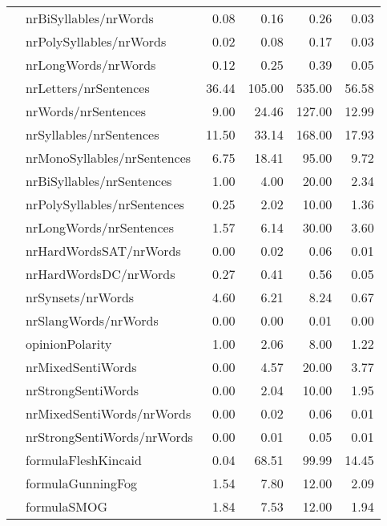 \begin{tabular}{|l|l|r|r|r|r|}
 & nrBiSyllables/nrWords & 0.08 & 0.16 & 0.26 & 0.03 \\ \cline{2-6}
 & nrPolySyllables/nrWords & 0.02 & 0.08 & 0.17 & 0.03 \\ \cline{2-6}
 & nrLongWords/nrWords & 0.12 & 0.25 & 0.39 & 0.05 \\ \hline
\parbox[t]{2mm}{} & nrLetters/nrSentences & 36.44 & 105.00 & 535.00 & 56.58 \\ 
 & nrWords/nrSentences & 9.00 & 24.46 & 127.00 & 12.99 \\ 
 & nrSyllables/nrSentences & 11.50 & 33.14 & 168.00 & 17.93 \\ 
 & nrMonoSyllables/nrSentences & 6.75 & 18.41 & 95.00 & 9.72 \\ 
 & nrBiSyllables/nrSentences & 1.00 & 4.00 & 20.00 & 2.34 \\ 
 & nrPolySyllables/nrSentences & 0.25 & 2.02 & 10.00 & 1.36 \\ 
 & nrLongWords/nrSentences & 1.57 & 6.14 & 30.00 & 3.60 \\ \hline
\parbox[t]{2mm}{} & nrHardWordsSAT/nrWords & 0.00 & 0.02 & 0.06 & 0.01 \\ 
 & nrHardWordsDC/nrWords & 0.27 & 0.41 & 0.56 & 0.05 \\ 
 & nrSynsets/nrWords & 4.60 & 6.21 & 8.24 & 0.67 \\ 
 & nrSlangWords/nrWords & 0.00 & 0.00 & 0.01 & 0.00 \\ \hline
\parbox[t]{2mm}{} & opinionPolarity & 1.00 & 2.06 & 8.00 & 1.22 \\ 
 & nrMixedSentiWords & 0.00 & 4.57 & 20.00 & 3.77 \\ 
 & nrStrongSentiWords & 0.00 & 2.04 & 10.00 & 1.95 \\ 
 & nrMixedSentiWords/nrWords & 0.00 & 0.02 & 0.06 & 0.01 \\ 
 & nrStrongSentiWords/nrWords & 0.00 & 0.01 & 0.05 & 0.01 \\ \hline
\parbox[t]{2mm}{} & formulaFleshKincaid & 0.04 & 68.51 & 99.99 & 14.45 \\ 
 & formulaGunningFog & 1.54 & 7.80 & 12.00 & 2.09 \\ 
 & formulaSMOG & 1.84 & 7.53 & 12.00 & 1.94 \\ 

\end{tabular}

